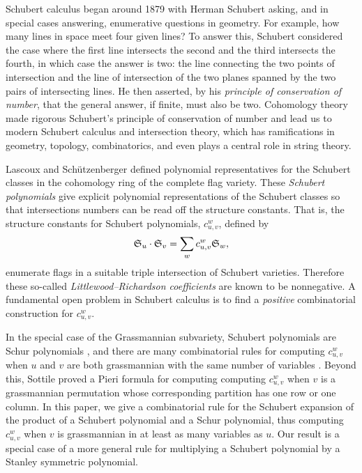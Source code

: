 \documentclass[11pt]{amsart}
\theoremstyle{definition}
\theoremstyle{remark}
\numberwithin{equation}{section}
\newcommand{\schubert}{\ensuremath\mathfrak{S}}
\begin{document}
Schubert calculus began around 1879 with Herman Schubert asking, and in special cases answering, enumerative questions in geometry\cite{Sch79}. For example, how many lines in space meet four given lines? To answer this, Schubert considered the case where the first line intersects the second and the third intersects the fourth, in which case the answer is two: the line connecting the two points of intersection and the line of intersection of the two planes spanned by the two pairs of intersecting lines. He then asserted, by his \emph{principle of conservation of number}, that the general answer, if finite, must also be two. Cohomology theory made rigorous Schubert's principle of conservation of number and lead us to modern Schubert calculus and intersection theory, which has ramifications in geometry, topology, combinatorics, and even plays a central role in string theory.

Lascoux and Sch{\"u}tzenberger \cite{LS82} defined polynomial representatives for the Schubert classes in the cohomology ring of the complete flag variety. These \emph{Schubert polynomials} give explicit polynomial representations of the Schubert classes so that intersections numbers can be read off the structure constants. That is, the structure constants for Schubert polynomials, $c_{u,v}^{w}$, defined by
\begin{displaymath}
  \schubert_{u} \cdot \schubert_{v} = \sum_{w} c_{u,v}^{w} \schubert_{w},
\end{displaymath}
enumerate flags in a suitable triple intersection of Schubert varieties. Therefore these so-called \emph{Littlewood--Richardson coefficients} are known to be nonnegative. A fundamental open problem in Schubert calculus is to find a \emph{positive} combinatorial construction for $c_{u,v}^{w}$.

In the special case of the Grassmannian subvariety, Schubert polynomials are Schur polynomials \cite{LS82}, and there are many combinatorial rules for computing $c_{u,v}^{w}$ when $u$ and $v$ are both grassmannian with the same number of variables \cite{LR34}. Beyond this, Sottile \cite{Sot96} proved a Pieri formula for computing computing $c_{u,v}^{w}$ when $v$ is a grassmannian permutation whose corresponding partition has one row or one column. In this paper, we give a combinatorial rule for the Schubert expansion of the product of a Schubert polynomial and a Schur polynomial, thus computing $c_{u,v}^{w}$ when $v$ is grassmannian in at least as many variables as $u$. Our result is a special case of a more general rule for multiplying a Schubert polynomial by a Stanley symmetric polynomial. 
\end{document}
